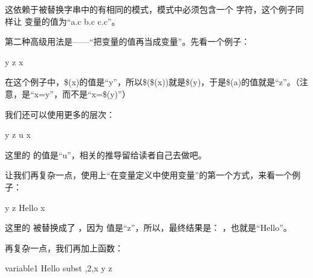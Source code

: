 \documentclass[a4paper,10pt]{sphinxmanual}
\begin{document}
这依赖于被替换字串中的有相同的模式，模式中必须包含一个 \sphinxcode{\sphinxupquote{\%}} 字符，这个例子同样让
 变量的值为“a.c b.c c.c”。

第二种高级用法是——“把变量的值再当成变量”。先看一个例子：

\begin{sphinxVerbatim}[commandchars=\\\{\}]
  y
  z
  x
\end{sphinxVerbatim}

在这个例子中，\$(x)的值是“y”，所以\$(\$(x))就是\$(y)，于是\$(a)的值就是“z”。（注意，是“x=y”，而不是“x=\$(y)”）

我们还可以使用更多的层次：

\begin{sphinxVerbatim}[commandchars=\\\{\}]
  y
  z
  u
  x
\end{sphinxVerbatim}

这里的  的值是“u”，相关的推导留给读者自己去做吧。

让我们再复杂一点，使用上“在变量定义中使用变量”的第一个方式，来看一个例子：

\begin{sphinxVerbatim}[commandchars=\\\{\}]
  y
  z
  Hello
  x
\end{sphinxVerbatim}

这里的  被替换成了  ，因为  值是“z”，所以，最终结果是：
 ，也就是“Hello”。

再复杂一点，我们再加上函数：

\begin{sphinxVerbatim}[commandchars=\\\{\}]
  variable1
  Hello
  subst ,2,x
  y
  z
\end{sphinxVerbatim}
\end{document}
